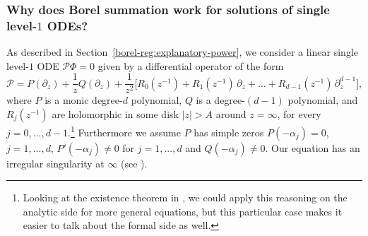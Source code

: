 \documentclass{article}
\theoremstyle{definition}
\theoremstyle{plain}
\begin{document}
\subsubsection{Why does Borel summation work for solutions of single level-$1$ ODEs?}
As described in Section~\ref{borel-reg:explanatory-power}, we consider a linear single level-$1$ ODE $\mathcal{P}\Phi = 0$ given by a differential operator of the form
\begin{equation}\label{eqn:standard ODE}
\mathcal{P} = P(\partial_z) + \frac{1}{z} Q(\partial_z) + \frac{1}{z^2}\big[ R_0(z^{-1}) + R_1(z^{-1})\,\partial_z + \ldots + R_{d-1}(z^{-1})\,\partial_z^{d-1} \big],
\end{equation}
where $P$ is a monic degree-$d$ polynomial, $Q$ is a degree-$(d-1)$ polynomial, and $R_j(z^{-1})$ are holomorphic in some disk $|z| > A$ around $z = \infty$, for every $j=0,\ldots, d-1$.\footnote{Looking at the existence theorem in \cite[Theorem 4]{reg-sing-volterra}, we could apply this reasoning on the analytic side for more general equations, but this particular case makes it easier to talk about the formal side as well.} Furthermore we assume $P$ has simple zeros $P(-\alpha_j)=0$, $j=1,...,d$, $P'(-\alpha_j)\neq 0$ for $j=1,...,d$ and $Q(-\alpha_j)\neq 0$. Our equation has an irregular singularity at $\infty$ (see \cite[Definition 3.3.2]{diverg-resurg--ii}).
\end{document}
